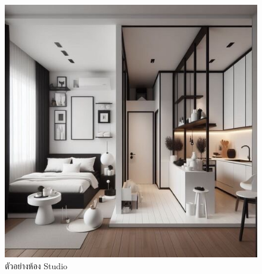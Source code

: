 \documentclass{report}
\begin{document}
\begin{figure}
    \centering
    \includegraphics[scale=0.2]{Studio.jpg}
    \caption{ตัวอย่างห้อง Studio}
    \label{fig:graph10}
\end{figure}
\end{document}

